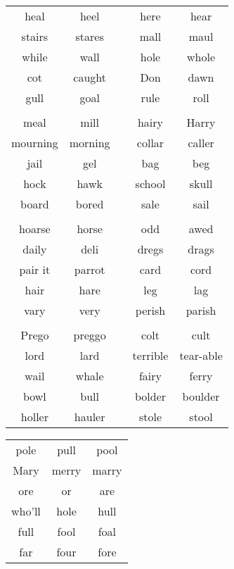 \begin{table}[h]

    \begin{subtable}{\textwidth}
    \centering
        \begin{tabular}{ c c c c c}
            heal  & heel  &  \multicolumn{1}{p{2cm}}{\hspace{0in}} & here  & hear \\
            stairs & stares && mall & maul \\
            while  & wall   && hole & whole \\
            cot    & caught && Don  & dawn \\
            gull   & goal   && rule & roll \\
            \\
            meal     & mill    && hairy  & Harry \\
            mourning & morning && collar & caller \\
            jail     & gel     && bag    & beg \\
            hock     & hawk    && school & skull \\
            board    & bored   && sale   & sail \\
            \\
            hoarse  & horse  && odd    & awed \\
            daily   & deli   && dregs  & drags \\
            pair it & parrot && card   & cord \\
            hair    & hare   && leg    & lag \\
            vary    & very   && perish & parish \\
            \\
            Prego  & preggo && colt     & cult \\
            lord   & lard   && terrible & tear-able \\
            wail   & whale  && fairy    & ferry \\
            bowl   & bull   && bolder   & boulder \\
            holler & hauler && stole    & stool
        \end{tabular}
    \label{tab:minimal_pairs}
    \end{subtable}
    
    \bigskip
    
    \begin{subtable}{\textwidth}
        \centering
        \begin{tabular}{c c c}
                pole   & pull  & pool \\
                Mary   & merry & marry\\ 
                ore    & or    & are \\
                who’ll & hole  & hull \\
                full   & fool  & foal \\
                far    & four  & fore
        \end{tabular}
        \label{tab:my_label}
    \end{subtable}
    
\end{table}